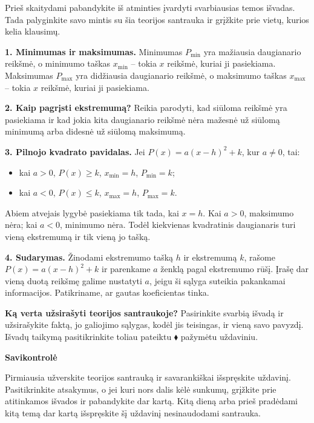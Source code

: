 \documentclass[12pt,a4paper]{article}
\newcommand{\svarbu}{\tikz[baseline=(zenklas.base)]\node[circle,draw=blue!50!black,line width=0.6pt,minimum size=4.5mm,inner sep=0pt,font=\sffamily\bfseries\small,text=blue!50!black] (zenklas) {!};}
\begin{document}
Prieš skaitydami pabandykite iš atminties įvardyti svarbiausias temos išvadas. Tada palyginkite savo mintis su šia teorijos santrauka ir grįžkite prie vietų, kurios kelia klausimų.
\begin{tcolorbox}[colback=blue!3,colframe=blue!40!black,boxrule=0.5pt,arc=1mm,colbacktitle=blue!8,coltitle=black,title={\svarbu\quad\bfseries Svarbiausios temos išvados}]
\textbf{1. Minimumas ir maksimumas.} Minimumas $P_{\min}$ yra mažiausia daugianario reikšmė, o minimumo taškas $x_{\min}$ – tokia $x$ reikšmė, kuriai ji pasiekiama. Maksimumas $P_{\max}$ yra didžiausia daugianario reikšmė, o maksimumo taškas $x_{\max}$ – tokia $x$ reikšmė, kuriai ji pasiekiama.

\textbf{2. Kaip pagrįsti ekstremumą?} Reikia parodyti, kad siūloma reikšmė yra pasiekiama ir kad jokia kita daugianario reikšmė nėra mažesnė už siūlomą minimumą arba didesnė už siūlomą maksimumą.

\textbf{3. Pilnojo kvadrato pavidalas.} Jei $P(x)=a(x-h)^2+k$, kur $a\ne0$, tai:
\begin{itemize}[leftmargin=*,itemsep=1pt,topsep=1pt]
\item kai $a>0$, $P(x)\ge k$, $x_{\min}=h$, $P_{\min}=k$;
\item kai $a<0$, $P(x)\le k$, $x_{\max}=h$, $P_{\max}=k$.
\end{itemize}
Abiem atvejais lygybė pasiekiama tik tada, kai $x=h$. Kai $a>0$, maksimumo nėra; kai $a<0$, minimumo nėra. Todėl kiekvienas kvadratinis daugianaris turi vieną ekstremumą ir tik vieną jo tašką.

\textbf{4. Sudarymas.} Žinodami ekstremumo tašką $h$ ir ekstremumą $k$, rašome $P(x)=a(x-h)^2+k$ ir parenkame $a$ ženklą pagal ekstremumo rūšį. Įrašę dar vieną duotą reikšmę galime nustatyti $a$, jeigu ši sąlyga suteikia pakankamai informacijos. Patikriname, ar gautas koeficientas tinka.
\end{tcolorbox}
\textbf{Ką verta užsirašyti teorijos santraukoje?} Pasirinkite svarbią išvadą ir užsirašykite faktą, jo galiojimo sąlygas, kodėl jis teisingas, ir vieną savo pavyzdį. Išvadų taikymą pasitikrinkite toliau pateiktu $\blacklozenge$ pažymėtu uždaviniu.
\newpage
\begin{center}{\Large\bfseries Savikontrolė}\end{center}
Pirmiausia užverskite teorijos santrauką ir savarankiškai išspręskite uždavinį. Pasitikrinkite atsakymus, o jei kuri nors dalis kėlė sunkumų, grįžkite prie atitinkamos išvados ir pabandykite dar kartą. Kitą dieną arba prieš pradėdami kitą temą dar kartą išspręskite šį uždavinį nesinaudodami santrauka.
\end{document}
